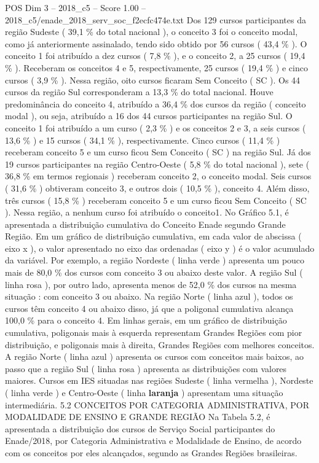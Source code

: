 \begin{textsample}{POS Dim 3 – 2018\_c5 – Score 1.00 – 2018\_c5/enade\_2018\_serv\_soc\_f2ecfc474e.txt}
Dos 129 cursos participantes da região Sudeste ( 39,1 \% do total nacional ), o conceito 3 foi o conceito modal, como já anteriormente assinalado, tendo sido obtido por 56 cursos ( 43,4 \% ).
O conceito 1 foi atribuído a dez cursos ( 7,8 \% ), e o conceito 2, a 25 cursos ( 19,4 \% ).
Receberam os conceitos 4 e 5, respectivamente, 25 cursos ( 19,4 \% ) e cinco cursos ( 3,9 \% ).
Nessa região, oito cursos ficaram Sem Conceito ( SC ).
Os 44 cursos da região Sul corresponderam a 13,3 \% do total nacional.
Houve predominância do conceito 4, atribuído a 36,4 \% dos cursos da região ( conceito modal ), ou seja, atribuído a 16 dos 44 cursos participantes na região Sul.
O conceito 1 foi atribuído a um curso ( 2,3 \% ) e os conceitos 2 e 3, a seis cursos ( 13,6 \% ) e 15 cursos ( 34,1 \% ), respectivamente.
Cinco cursos ( 11,4 \% ) receberam conceito 5 e um curso ficou Sem Conceito ( SC ) na região Sul.
Já dos 19 cursos participantes na região Centro-Oeste ( 5,8 \% do total nacional ), sete ( 36,8 \% em termos regionais ) receberam conceito 2, o conceito modal.
Seis cursos ( 31,6 \% ) obtiveram conceito 3, e outros dois ( 10,5 \% ), conceito 4.
Além disso, três cursos ( 15,8 \% ) receberam conceito 5 e um curso ficou Sem Conceito ( SC ).
Nessa região, a nenhum curso foi atribuído o conceito1.
No Gráfico 5.1, é apresentada a distribuição cumulativa do Conceito Enade segundo Grande Região.
Em um gráfico de distribuição cumulativa, em cada valor de abscissa ( eixo x ), o valor apresentado no eixo das ordenadas ( eixo y ) é o valor acumulado da variável.
Por exemplo, a região Nordeste ( linha verde ) apresenta um pouco mais de 80,0 \% dos cursos com conceito 3 ou abaixo deste valor.
A região Sul ( linha rosa ), por outro lado, apresenta menos de 52,0 \% dos cursos na mesma situação : com conceito 3 ou abaixo.
Na região Norte ( linha azul ), todos os cursos têm conceito 4 ou abaixo disso, já que a poligonal cumulativa alcança 100,0 \% para o conceito 4.
Em linhas gerais, em um gráfico de distribuição cumulativa, poligonais mais à esquerda representam Grandes Regiões com pior distribuição, e poligonais mais à direita, Grandes Regiões com melhores conceitos.
A região Norte ( linha azul ) apresenta os cursos com conceitos mais baixos, ao passo que a região Sul ( linha rosa ) apresenta as distribuições com valores maiores.
Cursos em IES situadas nas regiões Sudeste ( linha vermelha ), Nordeste ( linha verde ) e Centro-Oeste ( linha \textbf{laranja} ) apresentam uma situação intermediária. 5.2 CONCEITOS POR CATEGORIA ADMINISTRATIVA, POR MODALIDADE DE ENSINO E GRANDE REGIÃO Na Tabela 5.2, é apresentada a distribuição dos cursos de Serviço Social participantes do Enade/2018, por Categoria Administrativa e Modalidade de Ensino, de acordo com os conceitos por eles alcançados, segundo as Grandes Regiões brasileiras.

\end{textsample}
